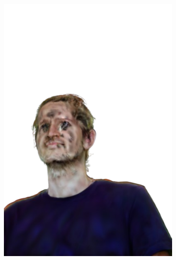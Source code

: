 \begin{figure}[ht]
\begin{subfigure}{0.2\linewidth}
		\includegraphics[width=\textwidth]{Figures/failed/rabbit/5_render-removebg-preview.png}
	\end{subfigure}
	\begin{subfigure}{0.2\linewidth}

\end{subfigure}
\end{figure}
